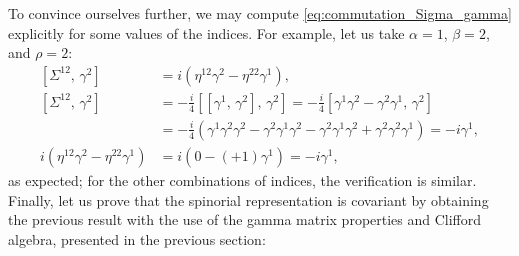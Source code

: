 To convince ourselves further, we may compute \eqref{eq:commutation_Sigma_gamma} explicitly for some values of the indices. For example, let us take \(\alpha = 1\), \(\beta = 2\), and \(\rho = 2\):
\[
    \begin{aligned}
        \left[ \Sigma^{12},\, \gamma^2 \right]                         & = i \left( \eta^{1 2} \gamma^{2} - \eta^{2 2} \gamma^{1} \right),                                                                                              \\
        \left[ \Sigma^{12},\, \gamma^2 \right]                         & = -\frac{i}{4} \left[ [\gamma^{1},\, \gamma^{2}],\, \gamma^2 \right] = -\frac{i}{4} \left[ \gamma^1 \gamma^2 - \gamma^2 \gamma^1,\, \gamma^2 \right]           \\
                                                                       & = -\frac{i}{4} \left( \gamma^1 \gamma^2 \gamma^2 - \gamma^2 \gamma^1 \gamma^2 - \gamma^2 \gamma^1 \gamma^2 + \gamma^2 \gamma^2 \gamma^1 \right) = -i \gamma^1, \\
        i \left( \eta^{1 2} \gamma^{2} - \eta^{2 2} \gamma^{1} \right) & = i \left( 0 - (+1) \gamma^1 \right) = -i \gamma^1,
    \end{aligned}
\]
as expected; for the other combinations of indices, the verification is similar. Finally, let us prove that the spinorial representation is covariant by obtaining the previous result with the use of the gamma matrix properties and Clifford algebra, presented in the previous section:

